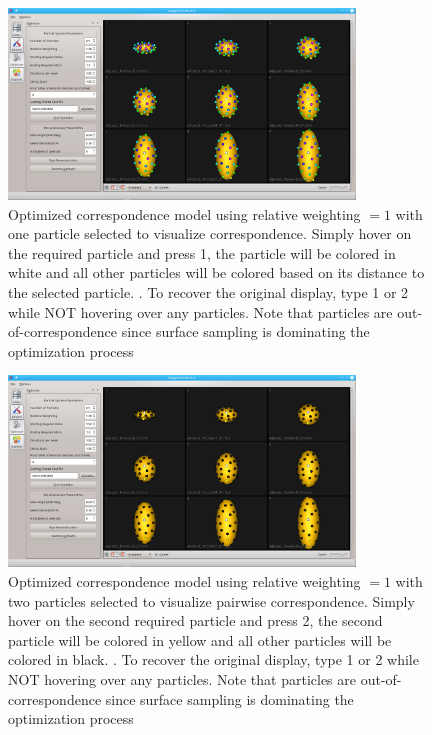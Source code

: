 \documentclass[letterpaper,12pt]{article}   %
\begin{document}
\begin{figure}[!htp]
	\centering
	\includegraphics[width=0.82\textwidth]{figs_v2/ellipsoid_w1_corr_qc_1.png}
	\caption{Optimized correspondence model using relative weighting $ = 1$ with one particle selected to visualize correspondence. Simply hover on the required particle and press 1, the particle will be colored in white and all other particles will be colored based on its distance to the selected particle. . To recover the original display, type 1 or 2 while NOT hovering over any particles. Note that particles are out-of-correspondence since surface sampling is dominating the optimization process}
	\label{fig:rel_high_hover1}
\end{figure}

\begin{figure}[!htp]
	\centering
	\includegraphics[width=0.82\textwidth]{figs_v2/ellipsoid_w1_corr_qc_2.png}
	\caption{Optimized correspondence model using relative weighting $ = 1$ with two particles selected to visualize pairwise correspondence. Simply hover on the second required particle and press 2, the second particle will be colored in yellow and all other particles will be colored in black. . To recover the original display, type 1 or 2 while NOT hovering over any particles. Note that particles are out-of-correspondence since surface sampling is dominating the optimization process}
	\label{fig:rel_high_hover2}
\end{figure}
\end{document}
